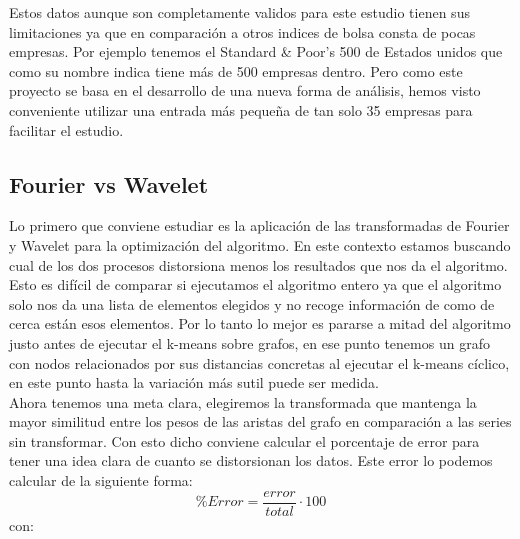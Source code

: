 \documentclass[12pt,a4paper]{article}
\begin{document}
		Estos datos aunque son completamente validos para este estudio tienen sus limitaciones ya que en comparación a otros indices de bolsa consta de pocas empresas. Por ejemplo tenemos el Standard \& Poor's 500 de Estados unidos que como su nombre indica tiene más de 500 empresas dentro. Pero como este proyecto se basa en el desarrollo de una nueva forma de análisis, hemos visto conveniente utilizar una entrada más pequeña de tan solo 35 empresas para facilitar el estudio.\\
		
		\subsection{Fourier vs Wavelet}
		Lo primero que conviene estudiar es la aplicación de las transformadas de Fourier y Wavelet para la optimización del algoritmo. En este contexto estamos buscando cual de los dos procesos distorsiona menos los resultados que nos da el algoritmo. Esto es difícil de comparar si ejecutamos el algoritmo entero ya que el algoritmo solo nos da una lista de elementos elegidos y no recoge información de como de cerca están esos elementos. Por lo tanto lo mejor es pararse a mitad del algoritmo justo antes de ejecutar el k-means sobre grafos, en ese punto tenemos un grafo con nodos relacionados por sus distancias concretas al ejecutar el k-means cíclico, en este punto hasta la variación más sutil puede ser medida.\\
		Ahora tenemos una meta clara, elegiremos la transformada que mantenga la mayor similitud entre los pesos de las aristas del grafo en comparación a las series sin transformar. Con esto dicho conviene calcular el porcentaje de error para tener una idea clara de cuanto se distorsionan los datos. Este error lo podemos calcular de la siguiente forma: \\
		\[ \%Error = \frac{error}{total} · 100\]
		con:\\
		
\end{document}
